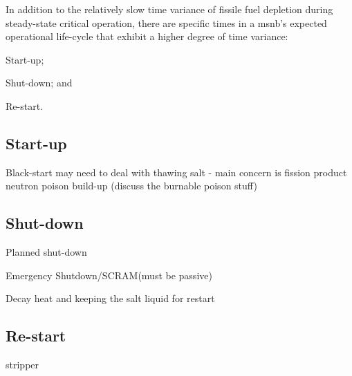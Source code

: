 In addition to the relatively slow time variance of fissile fuel depletion during steady-state critical operation, there are specific times in a \acs{msnb}'s expected operational life-cycle that exhibit a higher degree of time variance: 
\begin{enumerate*}[label=\arabic*)]
\item Start-up; \item Shut-down; and \item Re-start.
\end{enumerate*}

\subsection{Start-up}
Black-start may need to deal with thawing salt - main concern is fission product neutron poison build-up (discuss the burnable poison stuff)

\subsection{Shut-down}
Planned shut-down

Emergency Shutdown/SCRAM(must be passive)

Decay heat and keeping the salt liquid for restart

\subsection{Re-start}
\Xe stripper

